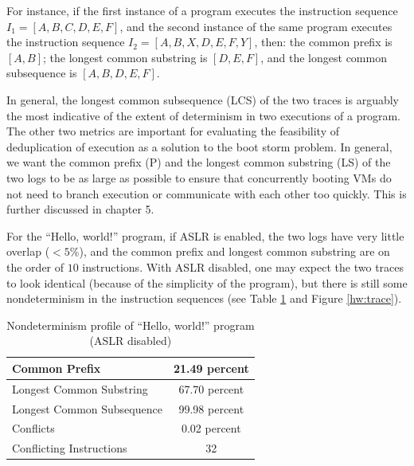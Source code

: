 For instance, if the first instance of a program
executes the instruction sequence $I_1 = [A, B, C, D, E, F]$,
and the second instance of the same program executes 
the instruction sequence $I_2 = [A, B, X, D, E, F, Y]$,
then: the common prefix is $[A, B]$; the longest
common substring is $[D, E, F]$, and the longest
common subsequence is $[A, B, D, E, F]$. 

In general, the longest common subsequence (LCS) of the two traces is
arguably the most indicative of the extent of determinism
in two executions of a program.
The other two metrics are important 
for evaluating the feasibility of deduplication of execution as
a solution to the boot storm problem. In general,
we want the common prefix (P) and the longest common substring (LS)
of the two logs to be as large as possible to
ensure that concurrently booting VMs do not need to branch
execution or communicate with each other too quickly. This
is further discussed in chapter 5.

For the ``Hello, world!'' program, if ASLR
is enabled, the two logs have very little
overlap ($< 5\%$), and the common
prefix and longest common substring
are on the order of $10$ instructions.
With ASLR disabled, one may 
expect the two traces to look identical (because
of the simplicity of the program), but
there is still some nondeterminism in the 
instruction sequences (see Table \ref{hw:stats}
and Figure \ref{hw:trace}).

\begin{table}
\caption{Nondeterminism profile of ``Hello, world!'' program (ASLR disabled)}
\label{hw:stats}
\begin{center}
\begin{tabular}{||l|c||}\hline
  Common Prefix & 21.49 percent \\\hline
  Longest Common Substring & 67.70 percent \\\hline
  Longest Common Subsequence & 99.98 percent \\\hline
  Conflicts & 0.02 percent \\\hline
  Conflicting Instructions & 32 \\\hline
\end{tabular}
\end{center}
\end{table}

